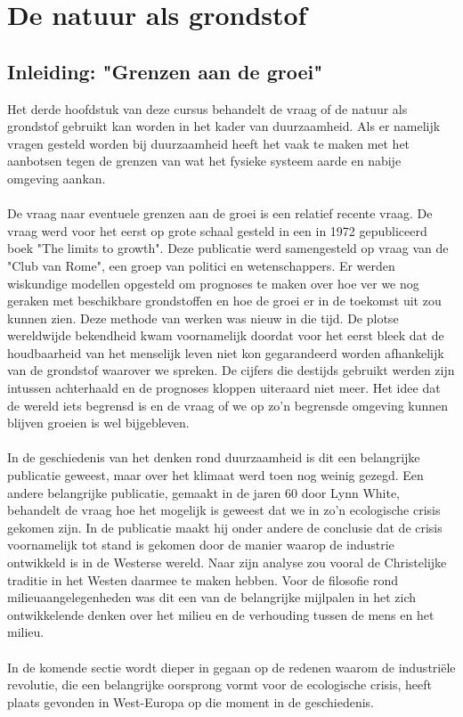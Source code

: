 \documentclass[../summary.tex]{subfiles}
\begin{document}
	
	\section{De natuur als grondstof}
	\subsection{Inleiding: "Grenzen aan de groei"}
	Het derde hoofdstuk van deze cursus behandelt de vraag of de natuur als grondstof gebruikt kan worden in het kader van duurzaamheid.  Als er  namelijk vragen gesteld worden bij duurzaamheid heeft het vaak te maken met het aanbotsen tegen de grenzen van wat het fysieke systeem aarde en nabije omgeving aankan. \\
	\\
	De vraag naar eventuele grenzen aan de groei is een relatief recente vraag.  De vraag werd voor het eerst op grote schaal gesteld in een in 1972 gepubliceerd boek  "The limits to growth". Deze publicatie werd samengesteld op vraag van de "Club van Rome", een groep van politici en wetenschappers. Er werden wiskundige modellen opgesteld om prognoses te maken over hoe ver we nog geraken met beschikbare grondstoffen en hoe de groei er in de toekomst uit zou kunnen zien. Deze methode van werken was nieuw in die tijd. De plotse wereldwijde bekendheid kwam voornamelijk doordat voor het eerst bleek dat de houdbaarheid van het menselijk leven niet kon gegarandeerd worden afhankelijk van de grondstof waarover we spreken. De cijfers die destijds gebruikt werden zijn intussen achterhaald en de prognoses kloppen uiteraard niet meer. Het idee dat de wereld iets begrensd is en de vraag of we op zo'n begrensde omgeving kunnen blijven groeien is wel bijgebleven. \\
	\\
	In de geschiedenis van het denken rond duurzaamheid is dit een belangrijke publicatie geweest, maar over het klimaat werd toen nog weinig gezegd.  Een andere belangrijke publicatie, gemaakt in de jaren 60 door Lynn White, behandelt de vraag hoe het mogelijk is geweest dat we in zo'n ecologische crisis gekomen zijn. In de publicatie maakt hij onder andere de conclusie dat de crisis voornamelijk tot stand is gekomen door de manier waarop de industrie ontwikkeld is in de Westerse wereld. Naar zijn analyse zou vooral de Christelijke traditie in het Westen daarmee te maken hebben. Voor de filosofie rond milieuaangelegenheden was dit een van de belangrijke mijlpalen in het zich ontwikkelende denken over het milieu en de verhouding tussen de mens en het milieu.\\
	\\
	In de komende sectie wordt dieper in gegaan op de redenen waarom de industriële revolutie, die een belangrijke oorsprong vormt voor de ecologische crisis, heeft plaats gevonden in West-Europa op die moment in de geschiedenis.
\end{document}
